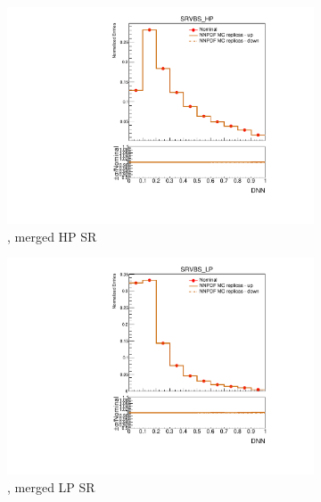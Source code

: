 \begin{figure}[ht]
\begin{subfigure}[b]{0.3\textwidth}
        \includegraphics[width=\textwidth]{figures/1lep/PDFUnc/NNPDF/ttbar_0ptag1pfat0pjet_0ptv_SRVBS_HP_DNN_SysTheoryPDF_NNPDF_ttbar__1up_Norm.pdf}
        \caption{\ttbar, merged HP SR}
    \end{subfigure}
    \begin{subfigure}[b]{0.3\textwidth}
        \includegraphics[width=\textwidth]{figures/1lep/PDFUnc/NNPDF/ttbar_0ptag1pfat0pjet_0ptv_SRVBS_LP_DNN_SysTheoryPDF_NNPDF_ttbar__1up_Norm.pdf}
        \caption{\ttbar, merged LP SR}
    \end{subfigure}
    \\
    \vspace{15mm}
    \begin{subfigure}[b]{0.3\textwidth}

\end{subfigure}
\end{figure}

